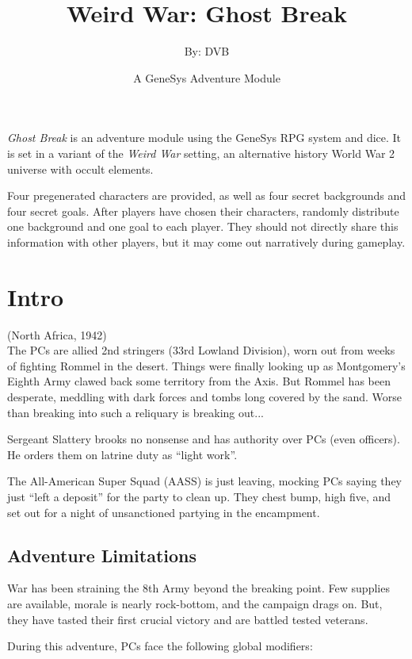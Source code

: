 \documentclass{book}
\title{Weird War: Ghost Break}
\author{By: DVB}
\date{A GeneSys Adventure Module}
\newcommand{\gb}{\emph{Ghost Break} }
\begin{document}
\maketitle

\begin{multicols}{2}

\gb is an adventure module using the GeneSys RPG system and dice.  It is set in a variant of the \emph{Weird War} setting, an alternative history World War 2 universe with occult elements.

Four pregenerated characters are provided, as well as four secret backgrounds and four secret goals.  After players have chosen their characters, randomly distribute one background and one goal to each player.  They should not directly share this information with other players, but it may come out narratively during gameplay.

\section{Intro}
(North Africa, 1942)\\

    The PCs are allied 2nd stringers (33rd Lowland Division), worn out from weeks of fighting Rommel in the desert.  Things were finally looking up as Montgomery's Eighth Army clawed back some territory from the Axis.  But Rommel has been desperate, meddling with dark forces and tombs long covered by the sand.  Worse than breaking into such a reliquary is breaking out...

    Sergeant Slattery brooks no nonsense and has authority over PCs (even officers).  He orders them on latrine duty as ``light work''.

    The All-American Super Squad (AASS) is just leaving, mocking PCs saying they just ``left a deposit'' for the party to clean up.  They chest bump, high five, and set out for a night of unsanctioned partying in the encampment. 

\subsection{Adventure Limitations}

    War has been straining the 8th Army beyond the breaking point.  Few supplies are available, morale is nearly rock-bottom, and the campaign drags on.  But, they have tasted their first crucial victory and are battled tested veterans.
    
    During this adventure, PCs face the following global modifiers:


\end{multicols}
\end{document}
